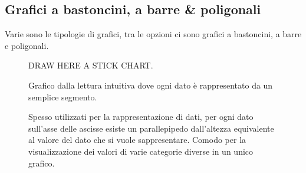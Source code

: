 \documentclass{article}
\begin{document}
  \subsection{Grafici a bastoncini, a barre \& poligonali}
    Varie sono le tipologie di grafici, tra le opzioni ci sono grafici a bastoncini, a barre e poligonali.
  
    \begin{figure}[h]
      \begin{minipage}{0.35\textwidth} %
        DRAW HERE A STICK CHART. 
      \end{minipage}
      \hfill
      \begin{minipage}{0.6\textwidth} %
        Grafico dalla lettura intuitiva dove ogni dato è rappresentato da un semplice segmento.
      \end{minipage}
    \end{figure}
    \begin{figure}[h]
      \begin{minipage}{0.35\textwidth} %
      \end{minipage}
      \hfill
      \begin{minipage}{0.6\textwidth} %
        Spesso utilizzati per la rappresentazione di dati, per ogni dato sull'asse delle ascisse esiste un parallepipedo dall'altezza equivalente al valore del dato che si vuole sappresentare. Comodo per la visualizzazione dei valori di varie categorie diverse in un unico grafico.
      \end{minipage}
    \end{figure}
\end{document}
